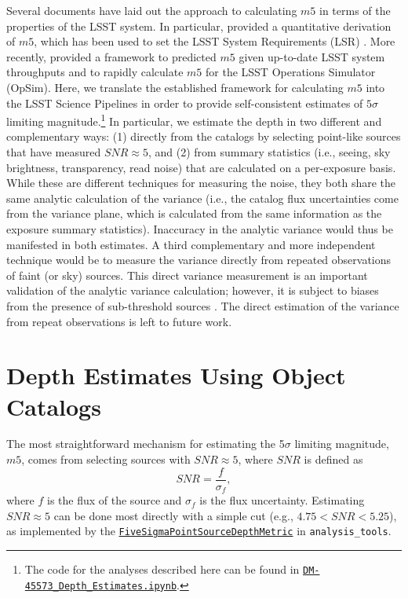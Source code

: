 \documentclass[DM,authoryear,toc]{lsstdoc}
\begin{document}
Several documents have laid out the approach to calculating $m5$ in terms of the properties of the LSST system. In particular, \citet{LSE-40} provided a quantitative derivation of $m5$, which has been used to set the LSST System Requirements (LSR) \citep{LSE-29}. More recently, \citet{SMTN-002} provided a framework to predicted $m5$ given up-to-date LSST system throughputs and to rapidly calculate $m5$ for the LSST Operations Simulator (OpSim). Here, we translate the established framework for calculating $m5$ into the LSST Science Pipelines in order to provide self-consistent estimates of $5\sigma$ limiting magnitude.\footnote{The code for the analyses described here can be found in \href{https://github.com/lsst-dm/vv-team-notebooks/tree/main/notebooks}{\texttt{DM-45573\_Depth\_Estimates.ipynb}}.} In particular, we estimate the depth in two different and complementary ways: (1) directly from the catalogs by selecting point-like sources that have measured ${SNR} \approx 5$, and (2) from summary statistics (i.e., seeing, sky brightness, transparency, read noise) that are calculated on a per-exposure basis. While these are different techniques for measuring the noise, they both share the same analytic calculation of the variance (i.e., the catalog flux uncertainties come from the variance plane, which is calculated from the same information as the exposure summary statistics). Inaccuracy in the analytic variance would thus be manifested in both estimates. A third complementary and more independent technique would be to measure the variance directly from repeated observations of faint (or sky) sources. This direct variance measurement is an important validation of the analytic variance calculation; however, it is subject to biases from the presence of sub-threshold sources \citep[e.g.,][]{Eckert:2020}. The direct estimation of the variance from repeat observations is left to future work.

\section{Depth Estimates Using Object Catalogs}

The most straightforward mechanism for estimating the 5$\sigma$ limiting magnitude, $m5$, comes from selecting sources with ${SNR} \approx 5$, where $SNR$ is defined as
\begin{equation}
\label{eqn:flux_snr}
SNR = \frac{f}{\sigma_f},
\end{equation}
where $f$ is the flux of the source and $\sigma_f$ is the flux uncertainty.
Estimating $SNR \approx 5$ can be done most directly with a simple cut (e.g., $4.75 < SNR < 5.25$), as implemented by the \href{https://github.com/lsst/analysis_tools/blob/1eab82deb581fff22c4bd353dabf200f98e2518d/python/lsst/analysis/tools/atools/limitingMagnitudeMetric.py}{\texttt{FiveSigmaPointSourceDepthMetric}} in \texttt{analysis\_tools}.
\end{document}
